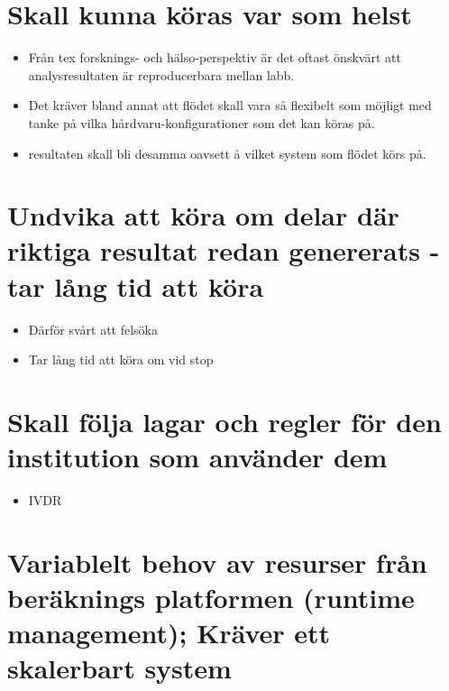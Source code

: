 \documentclass[
  letterpaper,
  DIV=11,
  numbers=noendperiod]{scrreprt}
\providecommand{\tightlist}{%
  \setlength{\itemsep}{0pt}\setlength{\parskip}{0pt}}\usepackage{longtable,booktabs,array}
\begin{document}
\section{Skall kunna köras var som
helst}\label{skall-kunna-kuxf6ras-var-som-helst}

\begin{itemize}
\item
  Från tex forsknings- och hälso-perspektiv är det oftast önskvärt att
  analysresultaten är reproducerbara mellan labb.
\item
  Det kräver bland annat att flödet skall vara så flexibelt som möjligt
  med tanke på vilka hårdvaru-konfigurationer som det kan köras på.
\item
  resultaten skall bli desamma oavsett å vilket system som flödet körs
  på.
\end{itemize}

\section{Undvika att köra om delar där riktiga resultat redan genererats
- tar lång tid att
köra}\label{undvika-att-kuxf6ra-om-delar-duxe4r-riktiga-resultat-redan-genererats---tar-luxe5ng-tid-att-kuxf6ra}

\begin{itemize}
\item
  Därför svårt att felsöka
\item
  Tar lång tid att köra om vid stop
\end{itemize}

\section{Skall följa lagar och regler för den institution som använder
dem}\label{skall-fuxf6lja-lagar-och-regler-fuxf6r-den-institution-som-anvuxe4nder-dem}

\begin{itemize}
\tightlist
\item
  IVDR
\end{itemize}

\section{Variablelt behov av resurser från beräknings platformen
(runtime management); Kräver ett skalerbart
system}\label{variablelt-behov-av-resurser-fruxe5n-beruxe4knings-platformen-runtime-management-kruxe4ver-ett-skalerbart-system}
\end{document}
